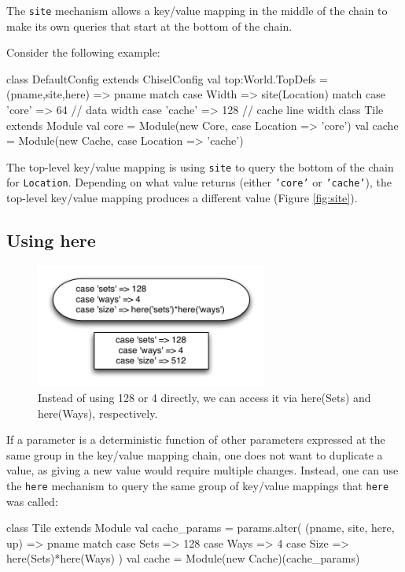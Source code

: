 \documentclass[10pt,twocolumn]{article}
\def\code#1{{\small\tt #1}}
\begin{document}
The \code{site} mechanism allows a key/value mapping in the middle of the chain to make its own queries that start at the bottom of the chain.

Consider the following example:
\begin{scala}
class DefaultConfig extends ChiselConfig { 
  val top:World.TopDefs = {
    (pname,site,here) => pname match {
       case Width => site(Location) match {
         case 'core' => 64 // data width
         case 'cache' => 128  // cache line width
       }
    }
  }
}
class Tile extends Module { 
  val core = Module(new Core, {case Location => 'core'})
  val cache = Module(new Cache, {case Location => 'cache'})
}
\end{scala}
The top-level key/value mapping is using \code{site} to query the bottom of the chain for \code{Location}. Depending on what value returns (either \code{'core'} or \code{'cache'}), the top-level key/value mapping produces a different value (Figure \ref{fig:site}).

\subsection{Using here}
\label{sec::here}

\begin{figure}[h]
\centering
\includegraphics[width=3in]{figs/here.pdf}
\caption{Instead of using 128 or 4 directly, we can access it via here(Sets) and here(Ways), respectively.}
\label{fig:alter}
\end{figure}

If a parameter is a deterministic function of other parameters expressed at the same group in the key/value mapping chain, one does not want to duplicate a value, as giving a new value would require multiple changes. Instead, one can use the \code{here} mechanism to query the same group of key/value mappings that \code{here} was called:

\begin{scala}
class Tile extends Module { 
  val cache_params = params.alter(
    (pname, site, here, up) => pname match {
      case Sets => 128
      case Ways => 4
      case Size => here(Sets)*here(Ways)
    })
  val cache = Module(new Cache)(cache_params)
}
\end{scala}
\end{document}
